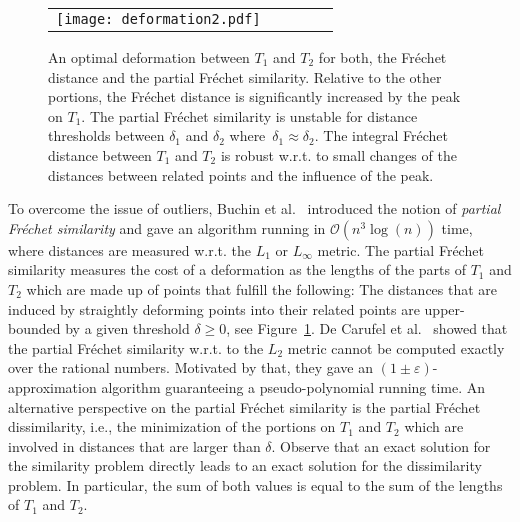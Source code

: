 \documentclass[a4paper,11pt]{article}
\begin{document}
\begin{figure}[ht]
  \begin{center}
    \begin{tabular}{ccccc}
      \texttt{[image: deformation2.pdf]} & &\\
\end{tabular}
  \end{center}
  \vspace*{-12pt}
  \caption{An optimal deformation between $T_1$ and $T_2$ for both, the Fr\'{e}chet distance and the partial Fr\'{e}chet similarity. Relative to the other portions, the Fr\'{e}chet distance is significantly increased by the peak on $T_1$. The partial Fr\'{e}chet similarity is unstable for distance thresholds between $\delta_1$ and $\delta_2$ where~$\delta_1 \approx \delta_2$. The integral Fr\'{e}chet distance between $T_1$ and $T_2$ is robust w.r.t. to small changes of the distances between related points and the influence of the peak. }
  \label{fig:outlier}
\end{figure}
	
	To overcome the issue of outliers, Buchin et al.~\cite{buchin:exact} introduced the notion of \emph{partial Fr\'{e}chet similarity} and gave an algorithm running in $\mathcal{O}(n^3 \log (n))$ time, where distances are measured w.r.t. the $L_1$ or $L_{\infty}$ metric. The partial Fr\'{e}chet similarity measures the cost of a deformation as the lengths of the parts of $T_1$ and $T_2$ which are made up of points that fulfill the following: The distances that are induced by straightly deforming points into their related points are upper-bounded by a given threshold $\delta \geq 0$, see Figure~\ref{fig:outlier}. De Carufel et al.~\cite{carufel:similarity} showed that the partial Fr\'{e}chet similarity w.r.t. to the $L_2$ metric cannot be computed exactly over the rational numbers. Motivated by that, they gave an $(1 \pm \varepsilon)$-approximation algorithm guaranteeing a pseudo-polynomial running time. An alternative perspective on the partial Fr\'{e}chet similarity is the partial Fr\'{e}chet dissimilarity, i.e., the minimization of the portions on $T_1$ and $T_2$ which are involved in distances that are larger than $\delta$. Observe that an exact solution for the similarity problem directly leads to an exact solution for the dissimilarity problem. In particular, the sum of both values is equal to the sum of the lengths of $T_1$ and $T_2$.
	
\end{document}
